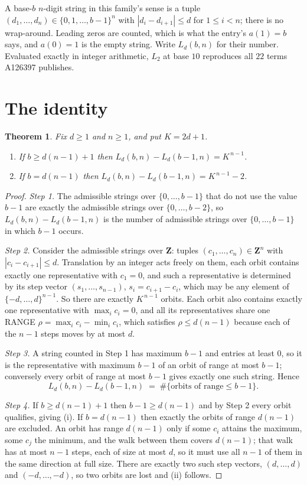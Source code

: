 \documentclass[11pt,a4paper]{article}
\theoremstyle{plain}
\newtheorem{theorem}{Theorem}
\theoremstyle{definition}
\begin{document}
A base-$b$ $n$-digit string in this family's sense is a tuple
$(d_1,\dots,d_n)\in\{0,1,\dots,b-1\}^{n}$ with $|d_i-d_{i+1}|\le d$ for $1\le i<n$; there
is no wrap-around. Leading zeros are counted, which is what the entry's $a(1)=b$ says, and
$a(0)=1$ is the empty string. Write $L_d(b,n)$ for their number. Evaluated exactly in integer
arithmetic, $L_{2}$ at base $10$ reproduces all $22$ terms A126397 publishes.

\section{The identity}

\begin{theorem}
Fix $d\ge1$ and $n\ge1$, and put $K=2d+1$.
\begin{enumerate}
\item[(i)] If $b\ge d(n-1)+1$ then $L_d(b,n)-L_d(b-1,n)=K^{\,n-1}$.
\item[(ii)] If $b=d(n-1)$ then $L_d(b,n)-L_d(b-1,n)=K^{\,n-1}-2$.
\end{enumerate}
\end{theorem}

\begin{proof}
\emph{Step 1.} The admissible strings over $\{0,\dots,b-1\}$ that do not use the value $b-1$
are exactly the admissible strings over $\{0,\dots,b-2\}$, so $L_d(b,n)-L_d(b-1,n)$ is the
number of admissible strings over $\{0,\dots,b-1\}$ in which $b-1$ occurs.

\emph{Step 2.} Consider the admissible strings over $\mathbf{Z}$: tuples
$(c_1,\dots,c_n)\in\mathbf{Z}^{n}$ with $|c_i-c_{i+1}|\le d$. Translation by an integer acts
freely on them, each orbit contains exactly one representative with $c_1=0$, and such a
representative is determined by its step vector $(s_1,\dots,s_{n-1})$, $s_i=c_{i+1}-c_i$,
which may be any element of $\{-d,\dots,d\}^{n-1}$. So there are exactly $K^{\,n-1}$ orbits.
Each orbit also contains exactly one representative with $\max_i c_i=0$, and all its
representatives share one RANGE $\rho=\max_ic_i-\min_ic_i$, which satisfies
$\rho\le d(n-1)$ because each of the $n-1$ steps moves by at most $d$.

\emph{Step 3.} A string counted in Step 1 has maximum $b-1$ and entries at least $0$, so it is
the representative with maximum $b-1$ of an orbit of range at most $b-1$; conversely every orbit
of range at most $b-1$ gives exactly one such string. Hence
\[
L_d(b,n)-L_d(b-1,n)\;=\;\#\{\text{orbits of range}\le b-1\} .
\]

\emph{Step 4.} If $b\ge d(n-1)+1$ then $b-1\ge d(n-1)$ and by Step 2 every orbit qualifies,
giving (i). If $b=d(n-1)$ then exactly the orbits of range $d(n-1)$ are excluded. An orbit has
range $d(n-1)$ only if some $c_i$ attains the maximum, some $c_j$ the minimum, and the walk
between them covers $d(n-1)$; that walk has at most $n-1$ steps, each of size at most $d$, so it
must use all $n-1$ of them in the same direction at full size. There are exactly two such step
vectors, $(d,\dots,d)$ and $(-d,\dots,-d)$, so two orbits are lost and (ii) follows.
\end{proof}
\end{document}
